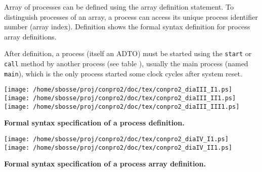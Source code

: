 \documentclass[a4paper,12pt,twoside,english]{article}
\begin{document}
\vskip5pt
Array of processes can be defined using the array definition statement. To distinguish processes of an array, a process can access its unique process identifier
number (array index). Definition   shows the formal syntax definition for process array definitions.


\vskip5pt
After definition, a process (itself an ADTO) must be started using the {\tt start} or {\tt call} method by another process (see table ), usually
the main process (named {\tt main}), which is the only process started some clock cycles after system reset.   


\vskip5pt
\def\defcontent{
\begin{center}
\texttt{[image: /home/sbosse/proj/conpro2/doc/tex/conpro2\_diaIII\_I1.ps]}\\\vskip3pt
\texttt{[image: /home/sbosse/proj/conpro2/doc/tex/conpro2\_diaIII\_II1.ps]}\\\vskip3pt
\texttt{[image: /home/sbosse/proj/conpro2/doc/tex/conpro2\_diaIII\_III1.ps]}\\\vskip3pt
\end{center}
}
\def\defdescription{
\caption{\bf Formal syntax specification of  a process definition.
}
\label{def:3}}

\begin{definition}
\let\normalsize\footnotesize \normalsize
\defcontent
\defdescription

\end{definition}
\def\defcontent{
\begin{center}
\texttt{[image: /home/sbosse/proj/conpro2/doc/tex/conpro2\_diaIV\_I1.ps]}\\\vskip3pt
\texttt{[image: /home/sbosse/proj/conpro2/doc/tex/conpro2\_diaIV\_II1.ps]}\\\vskip3pt
\end{center}
}
\def\defdescription{
\caption{\bf Formal syntax specification of  a process array definition.
}
\label{def:4}}

\begin{definition}
\let\normalsize\footnotesize \normalsize
\defcontent
\defdescription

\end{definition}
\end{document}

